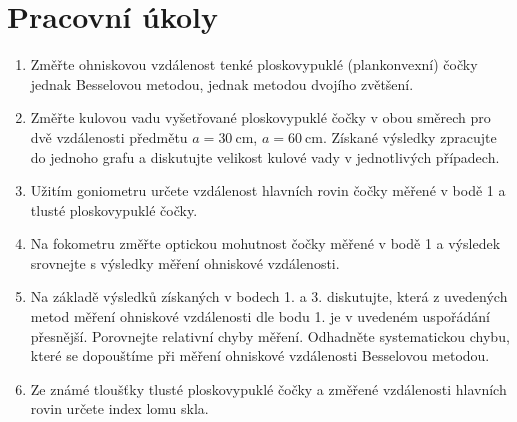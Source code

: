 \documentclass[a4paper]{article}
\author{Vladislav Wohlrath}
\begin{document}
\begin{titlepage}

\end{titlepage}

\section*{Pracovní úkoly}
\begin{enumerate}
\item Změřte ohniskovou vzdálenost tenké ploskovypuklé (plankonvexní) čočky jednak Besselovou metodou, jednak metodou dvojího zvětšení.
\item Změřte kulovou vadu vyšetřované ploskovypuklé čočky v obou směrech pro dvě vzdálenosti předmětu $a = \SI{30}{\cm}$, $a = \SI{60}{\cm}$. Získané výsledky zpracujte do jednoho grafu a diskutujte velikost kulové vady v jednotlivých případech.
\item Užitím goniometru určete vzdálenost hlavních rovin čočky měřené v bodě 1 a tlusté ploskovypuklé čočky.
\item Na fokometru změřte optickou mohutnost čočky měřené v bodě 1 a výsledek srovnejte s výsledky měření ohniskové vzdálenosti.
\item Na základě výsledků získaných v bodech 1. a 3. diskutujte, která z uvedených metod měření ohniskové vzdálenosti dle bodu 1. je v uvedeném uspořádání přesnější. Porovnejte relativní chyby měření. Odhadněte systematickou chybu, které se dopouštíme při měření ohniskové vzdálenosti Besselovou metodou.
\item Ze známé tloušťky tlusté ploskovypuklé čočky a změřené vzdálenosti hlavních rovin určete index lomu skla.
\end{enumerate}










\printbibliography[title={Seznam použité literatury}]
\end{document}
